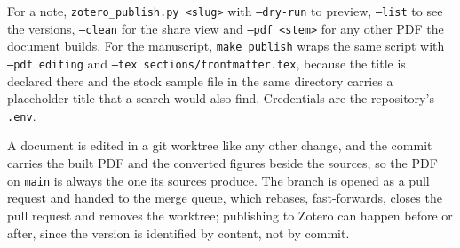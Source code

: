 For a note, \texttt{zotero\_publish.py <slug>} with \texttt{--dry-run} to preview,
\texttt{--list} to see the versions, \texttt{--clean} for the share view and
\texttt{--pdf <stem>} for any other PDF the document builds. For the manuscript,
\texttt{make publish} wraps the same script with \texttt{--pdf editing} and
\texttt{--tex sections/frontmatter.tex}, because the title is declared there and
the stock sample file in the same directory carries a placeholder title that a
search would also find. Credentials are the repository's \texttt{.env}.

A document is edited in a git worktree like any other change, and the commit
carries the built PDF and the converted figures beside the sources, so the PDF on
\texttt{main} is always the one its sources produce. The branch is opened as a
pull request and handed to the merge queue, which rebases, fast-forwards, closes
the pull request and removes the worktree; publishing to Zotero can happen before
or after, since the version is identified by content, not by commit.
